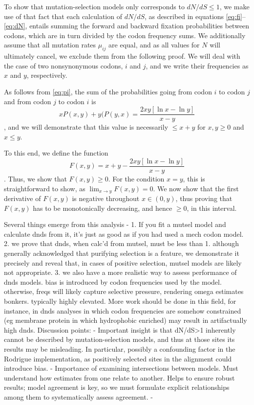 \documentclass[11pt]{article}
\begin{document}
To show that mutation-selection models only corresponds to $dN/dS \leq 1$, we make use of that fact that each calculation of $dN/dS$, as described in equations \eqref{eq:fi}--\eqref{eq:dN}, entails summing the forward and backward fixation probabilities between codons, which are in turn divided by the codon frequency sums. We additionally assume that all mutation rates $\mu_{ij}$ are equal, and as all values for $N$ will ultimately cancel, we exclude them from the following proof. We will deal with the case of two nonsynonymous codons, $i$ and $j$, and we write their frequencies as $x$ and $y$, respectively.

As follows from \eqref{eq:pi}, the sum of the probabilities going from codon $i$ to codon $j$ and from codon $j$ to codon $i$ is \begin{equation} xP(x,y) + y(P(y,x) = \frac{2xy [\ln x - \ln y]}{x - y}\end{equation}, and we will demonstrate that this value is necessarily $\leq x + y$ for $x,y \geq 0$ and $x \leq y$.

To this end, we define the function \begin{equation} F(x,y) = x + y - \frac{2xy [\ln x - \ln y]}{x - y} \end{equation}. Thus, we show that $F(x,y) \geq 0$. For the condition $x=y$, this is straightforward to show, as $\lim_{x \to y}F(x,y) = 0$.
We now show that the first derivative of $F(x, y)$ is negative throughout $x \in (0,y)$, thus proving that $F(x, y)$ has to be monotonically decreasing, and hence $\geq0$, in this interval.
	
\newpage
	


	
 Several things emerge from this analysis - 
1. If you fit a mutsel model and calculate dnds from it, it's just as good as if you had used a mech codon model. 
2. we prove that dnds, when calc'd from mutsel, must be less than 1. although generally acknowledged that purifying selection is a feature, we demonstrate it precisely and reveal that, in cases of positive selection, mutsel models are likely not appropriate.
3. we also have a more realistic way to assess performance of dnds models. bias is introduced by codon frequencies used by the model. otherwise, freqs will likely capture selective pressure, rendering omega estimates bonkers. typically highly elevated. More work should be done in this field, for instance, in dnds analyses in which codon frequencies are somehow constrained (eg membrane protein in which hydrophobic enriched) may result in artifactually high dnds.
Discussion points:
- Important insight is that dN/dS>1 inherently cannot be described by mutation-selection models, and thus at those sites its results may be misleading. In particular, possibly a confounding factor in the Rodrigue implementation, as positively selected sites in the alignment could introduce bias.
- Importance of examining intersections between models. Must understand how estimates from one relate to another. Helps to ensure robust results; model agreement is key, so we must formulate explicit relationships among them to systematically assess agreement.
- 
\end{document}
